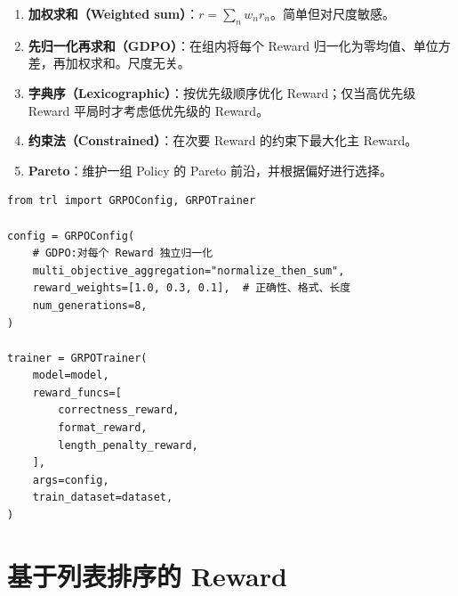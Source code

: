 \begin{keybox}
\begin{enumerate}
  \item \textbf{加权求和（Weighted sum）}：$r = \sum_n w_n r_n$。简单但对尺度敏感。
  \item \textbf{先归一化再求和（GDPO）}：在组内将每个 Reward 归一化为零均值、单位方差，再加权求和。尺度无关。
  \item \textbf{字典序（Lexicographic）}：按优先级顺序优化 Reward；仅当高优先级 Reward 平局时才考虑低优先级的 Reward。
  \item \textbf{约束法（Constrained）}：在次要 Reward 的约束下最大化主 Reward。
  \item \textbf{Pareto}：维护一组 Policy 的 Pareto 前沿，并根据偏好进行选择。
\end{enumerate}
\end{keybox}

\begin{examplebox}
\begin{lstlisting}[style=pythonstyle]
from trl import GRPOConfig, GRPOTrainer

config = GRPOConfig(
    # GDPO:对每个 Reward 独立归一化
    multi_objective_aggregation="normalize_then_sum",
    reward_weights=[1.0, 0.3, 0.1],  # 正确性、格式、长度
    num_generations=8,
)

trainer = GRPOTrainer(
    model=model,
    reward_funcs=[
        correctness_reward,
        format_reward,
        length_penalty_reward,
    ],
    args=config,
    train_dataset=dataset,
)
\end{lstlisting}
\end{examplebox}

\section{基于列表排序的 Reward}
\label{listwise-rank-based-rewards}

